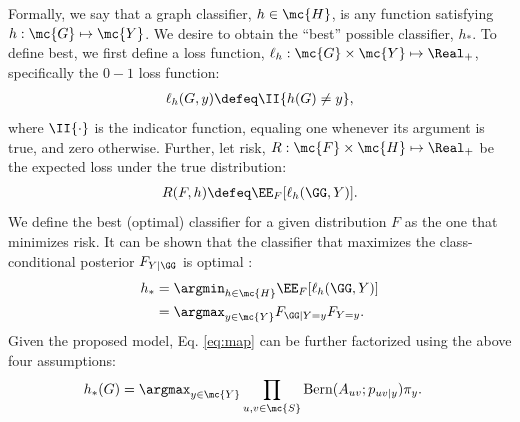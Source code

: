 \documentclass[10pt,journal,cspaper,compsoc]{IEEEtran}
\begin{document}
Formally, we say that a graph classifier, $h \in \mc{H}$, is any function satisfying $h: \mc{G} \mapsto \mc{Y}$.  We desire to obtain the ``best'' possible classifier, $h_*$. To define best, we first define a loss function, $\ell_h: \mc{G} \times \mc{Y} \mapsto \Real_+$, specifically the $0-1$ loss function:
\begin{align}
\ell_h(G,y) \defeq \II \{h(G) \neq y\}, %
\end{align}
where $\II\{\cdot\}$ is the indicator function, equaling one whenever its argument is true, and zero otherwise.  Further, let risk, $R: \mc{F} \times \mc{H} \mapsto \Real_+$ be the expected loss under the true distribution:
\begin{align}
R(F,h) \defeq \EE_F[\ell_h(\GG,Y)].
\end{align}
We define the best (optimal) classifier for a given distribution $F$ as the one that minimizes risk.
It can be shown that the classifier that maximizes the class-conditional posterior $F_{Y | \GG}$ is optimal \cite{Bickel2000}:
\begin{align} \label{eq:map}
h_* &= \argmin_{h \in \mc{H}} \EE_F[\ell_h (\GG,Y)] %
\nonumber \\ &= \argmax_{y \in \mc{Y}} F_{\GG|Y=y} F_{Y=y}.
\end{align}
Given the proposed model, Eq. \eqref{eq:map} can be further factorized using the above four assumptions:
\begin{align}
h_*(G)
&= \argmax_{y \in \mc{Y}} \prod_{u,v \in \mc{S}} \text{Bern}(A_{uv}; p_{uv|y}) \pi_y.
\end{align}
\end{document}
